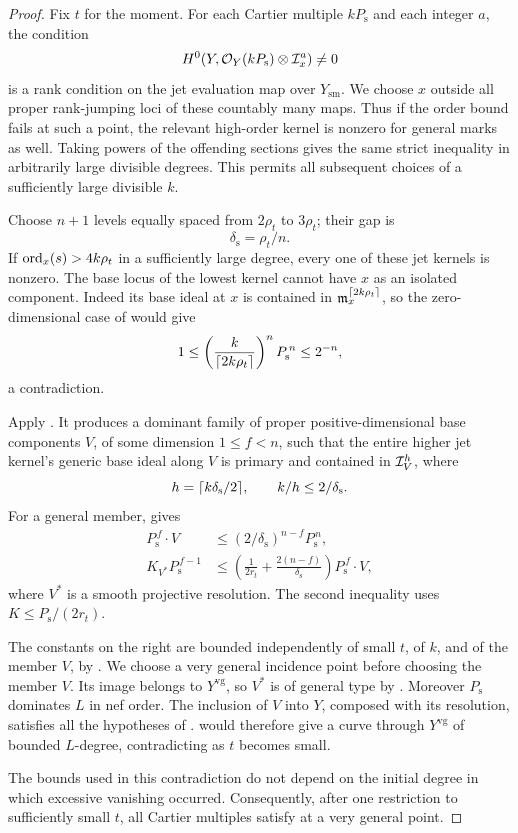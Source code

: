 \begin{proof}
Fix \(t\) for the moment. For each Cartier multiple \(kP_{\mathrm s}\)
and each integer \(a\), the condition
\[
 H^0(Y,\mathcal O_Y(kP_{\mathrm s})\otimes\mathcal I_x^a)\ne0
\]
is a rank condition on the jet evaluation map over \(Y_{\mathrm{sm}}\).
We choose \(x\) outside all proper rank-jumping loci of these
countably many maps. Thus if the order bound fails at such a point,
the relevant high-order kernel is nonzero for general marks as well.
Taking powers of the offending sections gives the same strict
inequality in arbitrarily large divisible degrees. This permits all
subsequent choices of a sufficiently large divisible \(k\).

Choose \(n+1\) levels equally spaced from \(2\rho_t\) to \(3\rho_t\);
their gap is
\[
 \delta_{\mathrm s}=\rho_t/n .
\]
If \(\operatorname{ord}_x(s)>4k\rho_t\) in a sufficiently large degree, every one of
these jet kernels is nonzero. The base locus of the lowest kernel
cannot have \(x\) as an isolated component. Indeed its base ideal at
\(x\) is contained in
\(\mathfrak m_x^{\lceil2k\rho_t\rceil}\), so the zero-dimensional case of
 would give
\[
 1\le
 \left(\frac{k}{\lceil2k\rho_t\rceil}\right)^nP_{\mathrm s}^{\,n}
 \le2^{-n},
\]
a contradiction.

Apply . It produces a dominant family
of proper positive-dimensional base components \(V\), of some
dimension \(1\le f<n\), such that the entire higher jet kernel's generic
base ideal along \(V\) is primary and contained in
\(\mathcal I_V^h\), where
\[
 h=\lceil k\delta_{\mathrm s}/2\rceil,
 \qquad k/h\le2/\delta_{\mathrm s}.
\]
For a general member,  gives
\begin{align}
 P_{\mathrm s}^{\,f}\cdot V
 &\le(2/\delta_{\mathrm s})^{n-f}P_{\mathrm s}^{\,n},
 \label{eq:scalar-center-volume}\\
 K_{V^*}P_{\mathrm s}^{\,f-1}
 &\le
 \left(\frac1{2r_t}+\frac{2(n-f)}{\delta_{\mathrm s}}\right)
 P_{\mathrm s}^{\,f}\cdot V ,
 \label{eq:scalar-center-canonical}
\end{align}
where \(V^*\) is a smooth projective resolution. The second inequality
uses \(K\le P_{\mathrm s}/(2r_t)\).

The constants on the right are bounded independently of small \(t\),
of \(k\), and of the member \(V\), by
. We choose a very general incidence
point before choosing the member \(V\). Its image belongs to
\(Y^{\mathrm{vg}}\), so \(V^*\) is of general type by
. Moreover \(P_{\mathrm s}\) dominates \(L\)
in nef order. The inclusion of \(V\) into \(Y\), composed with its
resolution, satisfies all the hypotheses of
. 
would therefore give a curve through \(Y^{\mathrm{vg}}\) of bounded
\(L\)-degree, contradicting
 as \(t\) becomes small.

The bounds used in this contradiction do not depend on the initial
degree in which excessive vanishing occurred. Consequently, after
one restriction to sufficiently small \(t\), all Cartier multiples
satisfy  at a very general point.
\end{proof}
